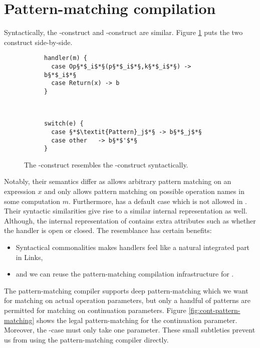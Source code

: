 \section{Pattern-matching compilation}
Syntactically, the -construct and -construct are similar. Figure \ref{fig:handler-switch} puts the two construct side-by-side.
\begin{figure}[h]
    \centering
    \begin{subfigure}[c]{0.45\textwidth}
        \centering
\begin{lstlisting}[style=links]
handler(m) {
  case Op§*$_i$*§(p§*$_i$*§,k§*$_i$*§) -> b§*$_i$*§
  case Return(x) -> b
}
\end{lstlisting}        
    \end{subfigure}%
    ~
    \begin{subfigure}[c]{0.45\textwidth}
        \centering
\begin{lstlisting}[style=links]
switch(e) {
  case §*$\textit{Pattern}_j$*§ -> b§*$_j$*§
  case other   -> b§*$'$*§
}
\end{lstlisting}       
    \end{subfigure}
\caption{The -construct resembles the -construct syntactically.}\label{fig:handler-switch}
\end{figure}
Notably, their semantics differ as  allows arbitrary pattern matching on an expression $x$ and  only allows pattern matching on possible operation names in some computation $m$. Furthermore,  has a default case  which is not allowed in . 
Their syntactic similarities give rise to a similar internal representation as well. Although, the internal representation of  contains extra attributes such as whether the handler is open or closed.
The resemblance has certain benefits:
\begin{itemize}
  \item Syntactical commonalities makes handlers feel like a natural integrated part in Links,
  \item and we can reuse the  pattern-matching compilation infrastructure for .
\end{itemize}
The  pattern-matching compiler supports deep pattern-matching which we want for matching on actual operation parameters, but only a handful of patterns are permitted for matching on continuation parameters. Figure \ref{fig:cont-pattern-matching} shows the legal pattern-matching for the continuation parameter. Moreover, the -case must only take one parameter. These small subtleties prevent us from using the  pattern-matching compiler directly.

